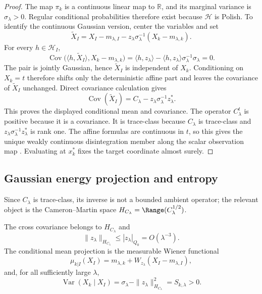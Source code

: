 \begin{proof}
The map $\pi_k$ is a continuous linear map to $\mathbb{R}$, and its marginal
variance is $\sigma_\lambda>0$.  Regular conditional probabilities therefore
exist because $\mathcal{H}$ is Polish.  To identify the continuous Gaussian
version, center the variables and set
\[
  \widetilde X_I
  =X_I-m_{\lambda,I}-z_\lambda\sigma_\lambda^{-1}(X_k-m_{\lambda,k}).
\]
For every $h\in\mathcal{H}_I$,
\[
  \operatorname{Cov}\bigl(\langle h,\widetilde X_I\rangle,
  X_k-m_{\lambda,k}\bigr)
  =\langle h,z_\lambda\rangle
   -\langle h,z_\lambda\rangle\sigma_\lambda^{-1}\sigma_\lambda
  =0.
\]
The pair is jointly Gaussian, hence $\widetilde X_I$ is independent of $X_k$.
Conditioning on $X_k=t$ therefore shifts only the deterministic affine part and
leaves the covariance of $\widetilde X_I$ unchanged.  Direct covariance
calculation gives
\[
  \operatorname{Cov}(\widetilde X_I)
  =C_\lambda-z_\lambda\sigma_\lambda^{-1}z_\lambda^*.
\]
This proves the displayed conditional mean and covariance.  The operator
$C_\lambda^t$ is positive because it is a covariance.  It is trace-class because
$C_\lambda$ is trace-class and $z_\lambda\sigma_\lambda^{-1}z_\lambda^*$ is
rank one.  The affine formulas are continuous in $t$, so this gives the unique
weakly continuous disintegration member along the scalar observation map
\cite{bogachev1998gaussian,lagatta2013continuous,steinwart2024conditioning,chen2024gaussian}.  Evaluating at $x_k^*$ fixes
the target coordinate almost surely.
\end{proof}

\subsection{Gaussian energy projection and entropy}

Since $C_\lambda$ is trace-class, its inverse is not a bounded ambient operator;
the relevant object is the Cameron--Martin space
$H_{C_\lambda}=\Range(C_\lambda^{1/2})$.

\begin{lemma}
\label{lem:conditional_predictor}
The cross covariance belongs to $H_{C_\lambda}$ and
\[
  \|z_\lambda\|_{H_{C_\lambda}}
  \le |z_\lambda|_{Q_0}=O(\lambda^{-3}).
\]
The conditional mean projection is the measurable Wiener functional
\[
  \mu_{k|I}(X_I)
  =
  m_{\lambda,k}
  +W_{z_\lambda}(X_I-m_{\lambda,I}),
\]
and, for all sufficiently large $\lambda$,
\[
  \operatorname{Var}(X_k\mid X_I)
  =
  \sigma_\lambda-\|z_\lambda\|_{H_{C_\lambda}}^2
  =S_{k,\lambda}>0.
\]
\end{lemma}

